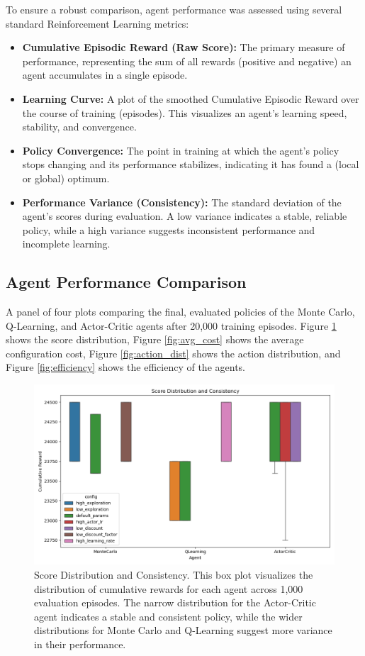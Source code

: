 \documentclass{article}
\begin{document}
To ensure a robust comparison, agent performance was assessed using several standard Reinforcement Learning metrics:
\begin{itemize}
    \item \textbf{Cumulative Episodic Reward (Raw Score):} The primary measure of performance, representing the sum of all rewards (positive and negative) an agent accumulates in a single episode.
    \item \textbf{Learning Curve:} A plot of the smoothed Cumulative Episodic Reward over the course of training (episodes). This visualizes an agent's learning speed, stability, and convergence.
    \item \textbf{Policy Convergence:} The point in training at which the agent's policy stops changing and its performance stabilizes, indicating it has found a (local or global) optimum.
    \item \textbf{Performance Variance (Consistency):} The standard deviation of the agent's scores during evaluation. A low variance indicates a stable, reliable policy, while a high variance suggests inconsistent performance and incomplete learning.
\end{itemize}

\subsection{Agent Performance Comparison}

A panel of four plots comparing the final, evaluated policies of the Monte Carlo, Q-Learning, and Actor-Critic agents after 20,000 training episodes. Figure \ref{fig:score_dist} shows the score distribution, Figure \ref{fig:avg_cost} shows the average configuration cost, Figure \ref{fig:action_dist} shows the action distribution, and Figure \ref{fig:efficiency} shows the efficiency of the agents.

\begin{figure}[h!]
    \centering
    \includegraphics[width=\textwidth]{figures/score_distribution.png}
    \caption{Score Distribution and Consistency. This box plot visualizes the distribution of cumulative rewards for each agent across 1,000 evaluation episodes. The narrow distribution for the Actor-Critic agent indicates a stable and consistent policy, while the wider distributions for Monte Carlo and Q-Learning suggest more variance in their performance.}
    \label{fig:score_dist}
\end{figure}
\end{document}
